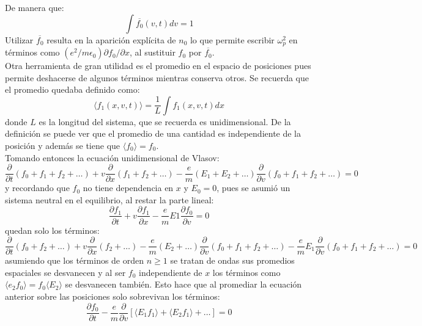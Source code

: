 \documentclass[../tesis_main_file.tex]{subfiles}
\begin{document}
De manera que:
\begin{equation}
\int \overline{f_0}(v,t)dv=1
\end{equation}
Utilizar $\overline{f_0}$ resulta en la aparición explícita de $n_0$ lo que permite escribir $\omega_p^2$ en términos como $(e^2/m\epsilon_0) \partial f_0 / \partial x$, al sustituir $f_0$ por $\overline{f_0}$.\\
Otra herramienta de gran utilidad es el promedio en el espacio de posiciones pues permite deshacerse de algunos términos mientras conserva otros. Se recuerda que el promedio quedaba definido como:
\begin{equation}
\langle f_1(x,v,t)\rangle =\frac{1}{L}\int f_1(x,v,t)dx
\end{equation}
donde $L$ es la longitud del sistema, que se recuerda es unidimensional. De la definición se puede ver que el promedio de una cantidad es independiente de la posición y además se tiene que $\langle f_0 \rangle =f_0$.\\
Tomando entonces la ecuación unidimensional de Vlasov:
\begin{equation}
\frac{\partial}{\partial t}\left(f_0+f_1+f_2+\dots \right)+v\frac{\partial}{\partial x}\left(f_1+f_2+\dots \right)-\frac{e}{m}\left(E_1+E_2+\dots \right)\frac{\partial}{\partial v}\left(f_0+f_1+f_2+\dots \right)=0
\end{equation}
y recordando que $f_0$ no tiene dependencia en $x$ y $E_0=0$, pues se asumió un sistema neutral en el equilibrio, al restar la parte lineal:
\begin{equation}
\frac{\partial f_1}{\partial t}+v\frac{\partial f_1}{\partial x}-\frac{e}{m}E1\frac{\partial f_0}{\partial v}=0
\end{equation}
quedan solo los términos:
\begin{equation}
\frac{\partial}{\partial t}\left(f_0+f_2+\dots \right)+v\frac{\partial}{\partial x}\left(f_2+\dots \right)-\frac{e}{m}\left(E_2+\dots \right)\frac{\partial}{\partial v}\left(f_0+f_1+f_2+\dots \right)-\frac{e}{m}E_1\frac{\partial}{\partial v}\left(f_0+f_1+f_2+\dots \right)=0
\end{equation}
asumiendo que los términos de orden $n\geq1$ se tratan de ondas sus promedios espaciales se desvanecen y al ser $f_0$ independiente de $x$ los términos como $\langle e_2 f_0 \rangle =f_0 \langle E_2 \rangle$ se desvanecen también. Esto hace que al promediar la ecuación anterior sobre las posiciones solo sobrevivan los términos:
\begin{equation}
\frac{\partial f_0}{\partial t}-\frac{e}{m}\frac{\partial}{\partial v} \left[ \langle E_1 f_1 \rangle +\langle E_2 f_1 \rangle + \dots\right]=0
\end{equation}
\end{document}
